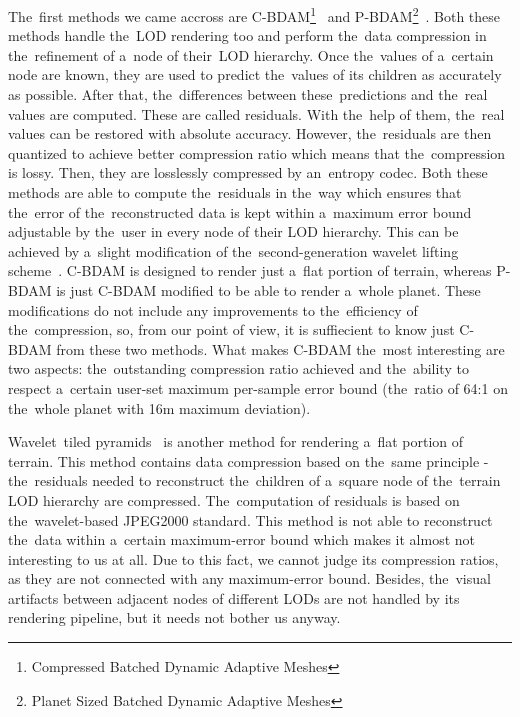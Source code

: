 The~first methods we came accross are C-BDAM\footnote{Compressed Batched Dynamic Adaptive Meshes}~\cite{cbdam} and P-BDAM\footnote{Planet Sized Batched Dynamic Adaptive Meshes}~\cite{pbdam}. Both these methods handle the~LOD rendering too and perform the~data compression in the~refinement of a~node of their~LOD hierarchy. Once the~values of a~certain node are known, they are used to predict the~values of its children as accurately as possible. After that, the~differences between these~predictions and the~real values are computed. These are called residuals. With the~help of them, the~real values can be restored with absolute accuracy. However, the~residuals are then quantized to achieve better compression ratio which means that the~compression is lossy. Then, they are losslessly compressed by an~entropy codec. Both these methods are able to compute the~residuals in the~way which ensures that the~error of the~reconstructed data is kept within a~maximum error bound adjustable by the~user in every node of their LOD hierarchy. This can be achieved by a~slight modification of the~second-generation wavelet lifting scheme~\cite{two-stage}. C-BDAM is designed to render just a~flat portion of terrain, whereas P-BDAM is just C-BDAM modified to be able to render a~whole planet. These modifications do not include any improvements to the~efficiency of the~compression, so, from our point of view, it is suffiecient to know just C-BDAM from these two methods. What makes C-BDAM the~most interesting are two aspects: the~outstanding compression ratio achieved and the~ability to respect a~certain user-set maximum per-sample error bound (the~ratio of 64:1 on the~whole planet with 16m maximum deviation).

Wavelet~tiled pyramids~\cite{jpeg2000terrain} is another method for rendering a~flat portion of terrain. This method contains data compression based on the~same principle - the~residuals needed to reconstruct the~children of a~square node of the~terrain LOD hierarchy are compressed. The~computation of residuals is based on the~wavelet-based JPEG2000 standard. This method is not able to reconstruct the~data within a~certain maximum-error bound which makes it almost not interesting to us at all. Due to this fact, we cannot judge its compression ratios, as they are not connected with any maximum-error bound. Besides, the~visual artifacts between adjacent nodes of different LODs are not handled by its rendering pipeline, but it needs not bother us anyway.

